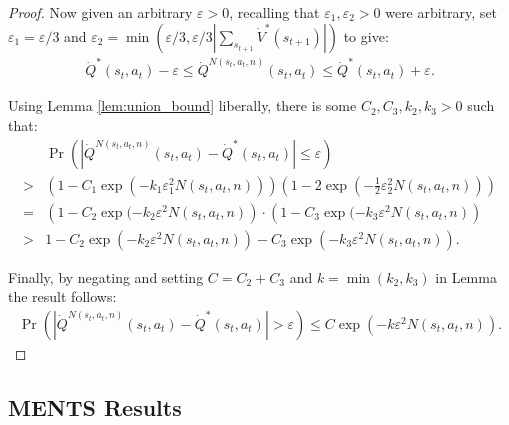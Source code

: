 \begin{proof}
            Now given an arbitrary $\varepsilon >0$, recalling that $\varepsilon_1,\varepsilon_2>0$ were arbitrary, set $\varepsilon_1 = \varepsilon/3$ and $\varepsilon_2 = \min(\varepsilon/3, \varepsilon/3|\sum_{s_{t+1}} \dot{V}^*(s_{t+1})|)$ to give:
            \begin{align}
                \dot{Q}^*(s_t,a_t) - \varepsilon \leq \dot{Q}^{N(s_t,a_t,n)}(s_t,a_t) \leq \dot{Q}^*(s_t,a_t) + \varepsilon.
            \end{align}
            
            Using Lemma \ref{lem:union_bound} liberally, there is some $C_2,C_3,k_2,k_3>0$ such that:
            \begin{align}
                &\Pr\left(\left| \dot{Q}^{N(s_t,a_t,n)}(s_t,a_t) - \dot{Q}^*(s_t,a_t) \right| \leq \varepsilon \right) \\
                    >& \left(1-C_1\exp(-k_1\varepsilon_1^2 N(s_t,a_t,n))\right) 
                        \left(1-2\exp\left(-\frac{1}{2}\varepsilon_2^2 N(s_t,a_t,n) \right)\right) \\
                    =& \left(1-C_2\exp(-k_2 \varepsilon^2 N(s_t,a_t,n) \right) 
                        \cdot \left(1-C_3\exp(-k_3 \varepsilon^2 N(s_t,a_t,n)\right) \\
                    >& 1 -C_2\exp(-k_2 \varepsilon^2 N(s_t,a_t,n)) -C_3\exp(-k_3 \varepsilon^2 N(s_t,a_t,n)).
            \end{align}
            
            Finally, by negating and setting $C=C_2+C_3$ and $k=\min(k_2,k_3)$ in Lemma  the result follows:
            \begin{align}
                    \Pr\left(\left| \dot{Q}^{N(s_t,a_t,n)}(s_t,a_t) - \dot{Q}^*(s_t,a_t) \right| > \varepsilon \right) \leq C\exp(-k\varepsilon^2 N(s_t,a_t,n)).
            \end{align}
        \end{proof}








    \subsection{MENTS Results} 
    \label{appsec:ments_results}

